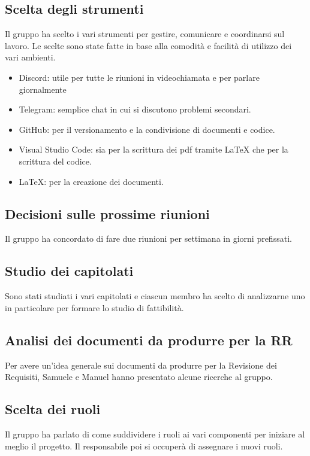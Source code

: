 \documentclass{article}
\begin{document}
        \subsection{Scelta degli strumenti}
        Il gruppo ha scelto i vari strumenti per gestire, comunicare e coordinarsi sul lavoro.
        Le scelte sono state fatte in base alla comodità e facilità di utilizzo dei
        vari ambienti.
        \begin{itemize}
            \item Discord: utile per tutte le riunioni in videochiamata e per parlare giornalmente
            \item Telegram: semplice chat in cui si discutono problemi secondari.
            \item GitHub: per il versionamento e la condivisione di documenti e codice.
            \item Visual Studio Code: sia per la scrittura dei pdf tramite LaTeX che per la scrittura del codice.
            \item LaTeX: per la creazione dei documenti.
        \end{itemize}

        \subsection{Decisioni sulle prossime riunioni}
        Il gruppo ha concordato di fare due riunioni per settimana in giorni prefissati.

        \subsection{Studio dei capitolati}
        Sono stati studiati i vari capitolati e ciascun membro ha scelto di analizzarne uno in particolare per formare lo studio di fattibilità.

        \subsection{Analisi dei documenti da produrre per la RR}
        Per avere un'idea generale sui documenti da produrre per la Revisione dei Requisiti,
        Samuele e Manuel hanno presentato alcune ricerche al gruppo.

        \subsection{Scelta dei ruoli}
        Il gruppo ha parlato di come suddividere i ruoli ai vari componenti per iniziare al meglio il progetto. Il responsabile poi si occuperà di assegnare i nuovi ruoli.
\end{document}
